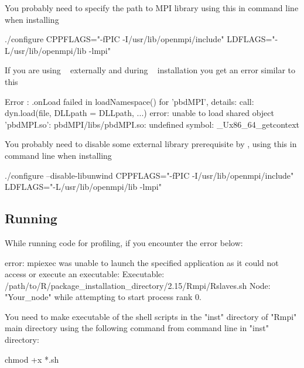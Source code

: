 \begin{solution}
You probably need to specify the path to MPI library
using this in command line when installing 
\begin{Output}
./configure CPPFLAGS="-fPIC -I/usr/lib/openmpi/include" LDFLAGS="-L/usr/lib/openmpi/lib -lmpi"
\end{Output}  
\end{solution}


\begin{problem}
If you are using ~\citep{mpiP} externally
and during ~\citep{Chen2012pbdMPIpackage}
installation you get an error similar to this
\begin{Output}
Error : .onLoad failed in loadNamespace() for 'pbdMPI', details:
  call: dyn.load(file, DLLpath = DLLpath, ...)
  error: unable to load shared object 'pbdMPI.so':
  pbdMPI/libs/pbdMPI.so: undefined symbol: _Ux86_64_getcontext
\end{Output}
\end{problem}
  
\begin{solution}
You probably need to disable some external library
prerequisite by ,
using this in command line when installing 
\begin{Code}
./configure --disable-libunwind CPPFLAGS="-fPIC -I/usr/lib/openmpi/include" LDFLAGS="-L/usr/lib/openmpi/lib -lmpi"
\end{Code}  
\end{solution}


\subsection{Running}

\begin{problem}
 While running  code for profiling, if you
encounter the error below:
\begin{Output}
error: mpiexec was unable to launch the specified application as it could not access
or execute an executable:
Executable: /path/to/R/package_installation_directory/2.15/Rmpi/Rslaves.sh
Node: "Your_node"
while attempting to start process rank 0.
\end{Output} 
\end{problem}

\begin{solution}
You need to make executable of the shell scripts in 
the "inst" directory of "Rmpi" main directory using the following command from 
command line in "inst" directory:
\begin{Code}
chmod +x *.sh
\end{Code}  
\end{solution}


